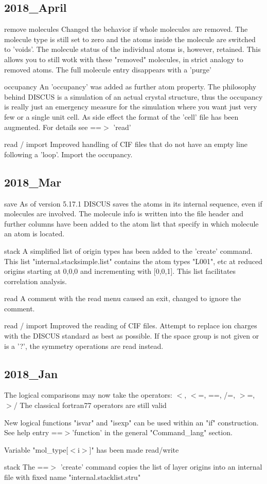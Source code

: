 \subsection*{2018\_April}
\par
remove molecules 
Changed the behavior if whole molecules are removed. The 
molecule type is still set to zero and the atoms inside the 
molecule are switched to 'voids'. The molecule status of the 
individual atoms is, however, retained. This allows you to still 
wotk with these "removed" molecules, in strict analogy to 
removed atoms. The full molecule entry disappears with a 'purge' 
\par
occupancy 
An 'occupancy' was added as further atom property. 
The philosophy behind DISCUS is a simulation of an actual 
crystal structure, thus the occupancy is really just an 
emergency measure for the simulation where you want just 
very few or a single unit cell. 
As side effect the format of the 'cell' file has been 
augmented. 
For details see ==$> $ 'read' 
\par
read / import 
Improved handling of CIF files that do not have an empty 
line following a 'loop'. 
Import the occupancy. 
\subsection*{2018\_Mar}
\par
save 
As of version 5.17.1 DISCUS saves the atoms in its internal 
sequence, even if molecules are involved. The molecule info 
is written into the file header and further columns have been 
added to the atom list that specify in which molecule an atom 
is located. 
\par
stack 
A simplified list of origin types has been added to the 
'create' command. This list "internal.stacksimple.list" 
contains the atom types "L001", etc at reduced origins 
starting at 0,0,0 and incrementing with [0,0,1]. This 
list facilitates correlation analysis. 
\par
read 
A comment with the read menu caused an exit, changed to 
ignore the comment. 
\par
read / import 
Improved the reading of CIF files. Attempt to replace ion 
charges with the DISCUS standard as best as possible. 
If the space group is not given or is a '?', the symmetry 
operations are read instead. 
\subsection*{2018\_Jan}
\par
The logical comparisons may now take the operators: 
$ <$, $ <$=, ==, /=, $> $=, $> $/ 
The classical fortran77 operators are still valid 
\par
New logical functions "isvar" and "isexp" can be used within an 
"if" construction. See help entry ==$> $'function' in the 
general "Command\_lang" section. 
\par
Variable "mol\_type[$ <$i$> $]" has been made read/write 
\par
stack 
The ==$> $ 'create' command copies the list of layer origins 
into an internal file with fixed name "internal.stacklist.stru" 
